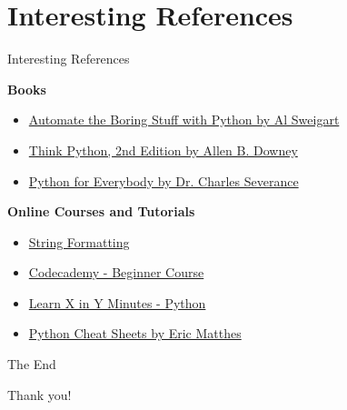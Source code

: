 \documentclass[
	11pt, 
]{beamer}
\begin{document}
\section{Interesting References}
\begin{frame}[fragile]{Interesting References}
\begin{exampleblock}{\textbf{Books}}
    
\begin{itemize}


\item \href{https://automatetheboringstuff.com/}{Automate the Boring Stuff with Python by Al Sweigart}

\item \href{http://greenteapress.com/thinkpython2/thinkpython2.pdf}{Think Python, 2nd Edition by Allen B. Downey}

\item \href{https://www.py4e.com/book.php}{Python for Everybody by Dr. Charles Severance}

\end{itemize}
\end{exampleblock}

\begin{exampleblock}{\textbf{Online Courses and Tutorials}}

\begin{itemize}

\item \href{https://mkaz.blog/working-with-python/string-formatting/}{String Formatting}

\item \href{https://www.codecademy.com/learn/learn-python-3}{Codecademy - Beginner Course}

\item \href{https://learnxinyminutes.com/docs/python/}{Learn X in Y Minutes - Python}

\item \href{https://ehmatthes.github.io/pcc_2e/cheat_sheets/cheat_sheets/}{Python Cheat Sheets by Eric Matthes}
\end{itemize}
\end{exampleblock}
\end{frame}



\begin{frame}[fragile]{The End}

\centering

\Huge Thank you!

\end{frame}
\end{document}
